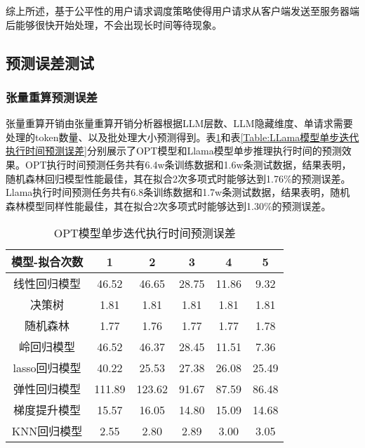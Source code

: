 综上所述，基于公平性的用户请求调度策略使得用户请求从客户端发送至服务器端后能够很快开始处理，不会出现长时间等待现象。

\subsection{预测误差测试}

\subsubsection{张量重算预测误差}

张量重算开销由张量重算开销分析器根据LLM层数、LLM隐藏维度、单请求需要处理的token数量、以及批处理大小预测得到。表\ref{Table:OPT模型单步迭代执行时间预测误差}和表\ref{Table:LLama模型单步迭代执行时间预测误差}分别展示了OPT模型和Llama模型单步推理执行时间的预测效果。OPT执行时间预测任务共有6.4w条训练数据和1.6w条测试数据，结果表明，随机森林回归模型性能最佳，其在拟合2次多项式时能够达到1.76\%的预测误差。Llama执行时间预测任务共有6.8条训练数据和1.7w条测试数据，结果表明，随机森林模型同样性能最佳，其在拟合2次多项式时能够达到1.30\%的预测误差。

\begin{table}[H]
  \centering
  \caption{OPT模型单步迭代执行时间预测误差}
  \label{Table:OPT模型单步迭代执行时间预测误差}
  \renewcommand{\arraystretch}{1.25}
  \small
  \begin{tabular}{c c c c c c}
    \toprule
    \textbf{模型-拟合次数} & \textbf{1} & \textbf{2} & \textbf{3} & \textbf{4} & \textbf{5} \\
    \midrule
    线性回归模型 & 46.52 & 46.65 & 28.75 & 11.86 & 9.32 \\ 
    决策树 & 1.81 & 1.81 & 1.81 & 1.81 & 1.81 \\ 
    随机森林 & 1.77 & 1.76 & 1.77 & 1.77 & 1.78 \\ 
    岭回归模型 & 46.52 & 46.37 & 28.45 & 11.51 & 7.36 \\ 
    lasso回归模型 & 40.22 & 25.53 & 27.38 & 26.08 & 25.49 \\ 
    弹性回归模型 & 111.89 & 123.62 & 91.67 & 87.59 & 86.48 \\ 
    梯度提升模型 & 15.57 & 16.05 & 14.80 & 15.09 & 14.68 \\ 
    KNN回归模型 & 2.55 & 2.80 & 2.89 & 3.00 & 3.05 \\ 
    \bottomrule
  \end{tabular}
\end{table}

